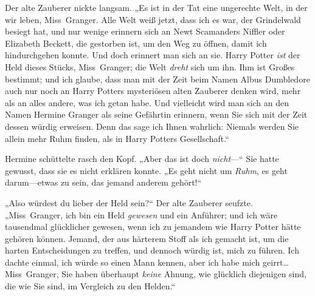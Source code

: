 Der alte Zauberer nickte langsam. „Es ist in der Tat eine ungerechte Welt, in der wir leben, Miss~Granger. Alle Welt weiß jetzt, dass ich es war, der Grindelwald besiegt hat, und nur wenige erinnern sich an Newt Scamanders Niffler oder Elizabeth Beckett, die gestorben ist, um den Weg zu öffnen, damit ich hindurchgehen konnte. Und doch erinnert man sich an sie. Harry Potter \emph{ist} der Held dieses Stücks, Miss~Granger; die Welt \emph{dreht} sich um ihn. Ihm ist Großes bestimmt; und ich glaube, dass man mit der Zeit beim Namen Albus Dumbledore auch nur noch an Harry Potters mysteriösen alten Zauberer denken wird, mehr als an alles andere, was ich getan habe. Und vielleicht wird man sich an den Namen Hermine Granger als seine Gefährtin erinnern, wenn Sie sich mit der Zeit dessen würdig erweisen. Denn das sage ich Ihnen wahrlich: Niemals werden Sie allein mehr Ruhm finden, als in Harry Potters Gesellschaft.“

Hermine schüttelte rasch den Kopf. „Aber das ist doch \emph{nicht}—“ Sie hatte gewusst, dass sie es nicht erklären konnte. „Es geht nicht um \emph{Ruhm}, es geht darum—etwas zu sein, das jemand anderem gehört!“

„Also würdest du lieber der Held sein?“ Der alte Zauberer seufzte. „Miss~Granger, ich bin ein Held \emph{gewesen} und ein Anführer; und ich wäre tausendmal glücklicher gewesen, wenn ich zu jemandem wie Harry Potter hätte gehören können. Jemand, der aus härterem Stoff als ich gemacht ist, um die harten Entscheidungen zu treffen, und dennoch würdig ist, mich zu führen. Ich dachte einmal, ich würde so einen Mann kennen, aber ich habe mich geirrt… Miss~Granger, Sie haben überhaupt \emph{keine} Ahnung, wie glücklich diejenigen sind, die wie Sie sind, im Vergleich zu den Helden.“

